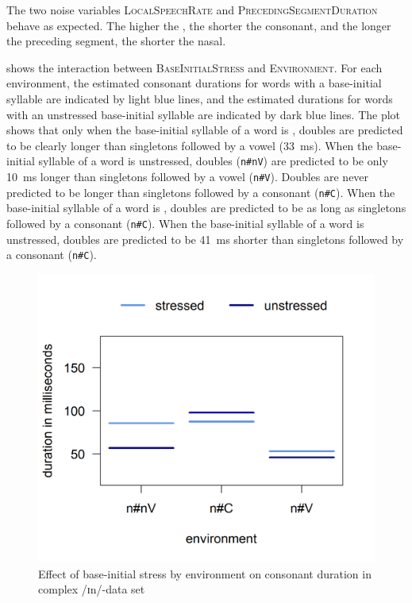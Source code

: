 The two noise variables \textsc{LocalSpeechRate} and \textsc{PrecedingSegmentDuration} behave as expected. The higher the , the shorter the consonant, and the longer the preceding segment, the shorter the nasal. 


 shows the interaction between \textsc{BaseInitialStress} and \textsc{Environment}. For each environment, the estimated consonant durations for words with a  base-initial syllable are indicated by light blue lines, and the estimated durations for words with an unstressed base-initial syllable are indicated by dark blue lines. 
The plot shows that only when the base-initial syllable of a word is , doubles are predicted to be clearly longer than singletons followed by a vowel (33~ms). When the base-initial syllable of a word is unstressed, doubles (\texttt{n\#nV}) are predicted to be only 10~ms longer than singletons followed by a vowel (\texttt{n\#V}).
Doubles are never predicted to be longer than singletons followed by a consonant  (\texttt{n\#C}).
When the base-initial syllable of a word is , doubles are predicted to be as long as singletons followed by a consonant (\texttt{n\#C}). When the base-initial syllable of a word is unstressed, doubles are predicted to be 41~ms shorter than singletons followed by a consonant (\texttt{n\#C}).




 	\begin{figure}

 		
 		\includegraphics [scale=0.5] {images/Experiment/InModelInterEnvStress}
		
 		\caption{Effect of base-initial stress by environment on consonant duration in complex /ɪn/-data set}		
 		\label{fig:Env Stress In experiment}

 	\end{figure}%
 	

